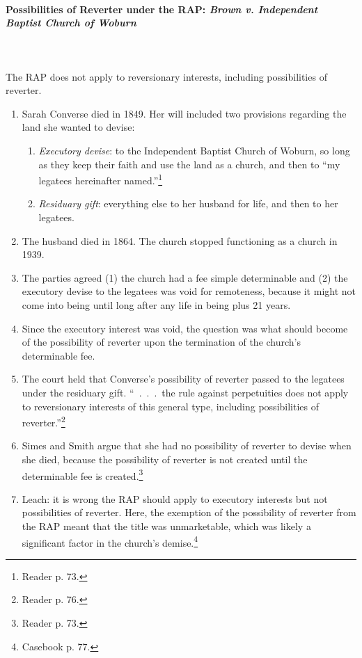 \paragraph{Possibilities of Reverter under the RAP: \emph{Brown v. Independent 
Baptist Church of Woburn}}
~\\\\
The RAP does not apply to reversionary interests, including possibilities of 
reverter.

\begin{enumerate}
    \item Sarah Converse died in 1849. Her will included two provisions 
    regarding the land she wanted to devise:
    \begin{enumerate}
        \item \emph{Executory devise}: to the Independent Baptist Church of 
        Woburn, so long as they keep their faith and use the land as a church, 
        and then to ``my legatees hereinafter named.''\footnote{Reader p. 73.} 
        \item \emph{Residuary gift}: everything else to her husband for life, 
        and then to her legatees.
    \end{enumerate}
    \item The husband died in 1864. The church stopped functioning as a church 
    in 1939.
    \item The parties agreed (1) the church had a fee simple determinable and 
    (2) the executory devise to the legatees was void for remoteness, because 
    it might not come into being until long after any life in being plus 21 
    years.
    \item Since the executory interest was void, the question was what should 
    become of the possibility of reverter upon the termination of the church's 
    determinable fee.
    \item The court held that Converse's possibility of reverter passed to the 
    legatees under the residuary gift. ``~.~.~.~the rule against perpetuities 
    does not apply to reversionary interests of this general type, including 
    possibilities of reverter.''\footnote{Reader p. 76.}
    \item Simes and Smith argue that she had no possibility of reverter to 
    devise when she died, because the possibility of reverter is not created 
    until the determinable fee is created.\footnote{Reader p. 73.}
    \item Leach: it is wrong the RAP should apply to executory interests but 
    not possibilities of reverter. Here, the exemption of the possibility of 
    reverter from the RAP meant that the title was unmarketable, which was 
    likely a significant factor in the church's demise.\footnote{Casebook p. 
    77.}
\end{enumerate}

